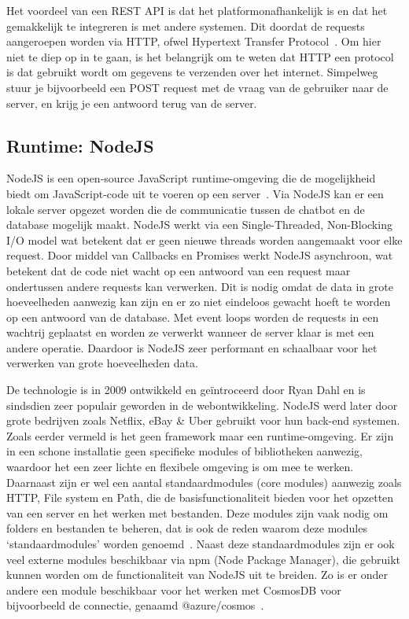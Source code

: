 Het voordeel van een REST API is dat het platformonafhankelijk is en dat het gemakkelijk te integreren is met andere systemen.
Dit doordat de requests aangeroepen worden via HTTP, ofwel Hypertext Transfer Protocol~\autocite{HTTP25}.
Om hier niet te diep op in te gaan, is het belangrijk om te weten dat HTTP een protocol is dat gebruikt wordt om gegevens te verzenden over het internet.
Simpelweg stuur je bijvoorbeeld een POST request met de vraag van de gebruiker naar de server, en krijg je een antwoord terug van de server.

\subsection{Runtime: NodeJS}
NodeJS is een open-source JavaScript runtime-omgeving die de mogelijkheid biedt om JavaScript-code uit te voeren op een server~\autocite{NodeJS2022}.
Via NodeJS kan er een lokale server opgezet worden die de communicatie tussen de chatbot en de database mogelijk maakt.
NodeJS werkt via een Single-Threaded, Non-Blocking I/O model wat betekent dat er geen nieuwe threads worden aangemaakt voor elke request.
Door middel van Callbacks en Promises werkt NodeJS asynchroon, wat betekent dat de code niet wacht op een antwoord van een request maar ondertussen andere requests kan verwerken.
Dit is nodig omdat de data in grote hoeveelheden aanwezig kan zijn en er zo niet eindeloos gewacht hoeft te worden op een antwoord van de database.
Met event loops worden de requests in een wachtrij geplaatst en worden ze verwerkt wanneer de server klaar is met een andere operatie.
Daardoor is NodeJS zeer performant en schaalbaar voor het verwerken van grote hoeveelheden data.

De technologie is in 2009 ontwikkeld en geïntroceerd door Ryan Dahl en is sindsdien zeer populair geworden in de webontwikkeling. 
NodeJS werd later door grote bedrijven zoals Netflix, eBay \& Uber gebruikt voor hun back-end systemen.
Zoals eerder vermeld is het geen framework maar een runtime-omgeving. 
Er zijn in een schone installatie geen specifieke modules of bibliotheken aanwezig, waardoor het een zeer lichte en flexibele omgeving is om mee te werken.
Daarnaast zijn er wel een aantal standaardmodules (core modules) aanwezig zoals HTTP, File system en Path, die de basisfunctionaliteit bieden voor het opzetten van een server en het werken met bestanden.
Deze modules zijn vaak nodig om folders en bestanden te beheren, dat is ook de reden waarom deze modules `standaardmodules' worden genoemd~\autocite{Kumar2023}.
Naast deze standaardmodules zijn er ook veel externe modules beschikbaar via npm (Node Package Manager), die gebruikt kunnen worden om de functionaliteit van NodeJS uit te breiden.
Zo is er onder andere een module beschikbaar voor het werken met CosmosDB voor bijvoorbeeld de connectie, genaamd @azure/cosmos~\autocite{cosmosNodeJS25}.

